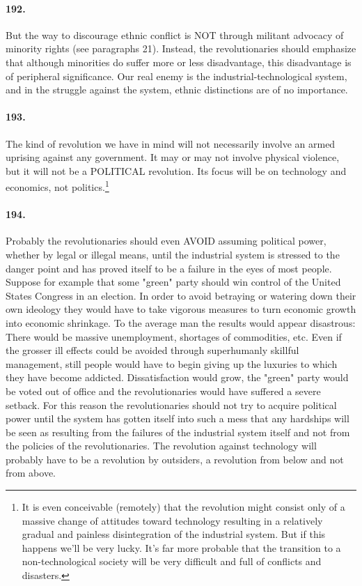 \documentclass[12pt]{book}
\begin{document}
\paragraph{192.}  But the way to discourage ethnic conflict is NOT through militant advocacy of minority rights (see paragraphs 21). Instead, the revolutionaries should emphasize that although minorities do suffer more or less disadvantage, this disadvantage is of peripheral significance. Our real enemy is the industrial-technological system, and in the struggle against the system, ethnic distinctions are of no importance.


\paragraph{193.} The kind of revolution we have in mind will not necessarily involve an armed uprising against any government. It may or may not involve physical violence, but it will not be a POLITICAL revolution. Its focus will be on technology and economics, not politics.\footnote{It is even conceivable (remotely) that the revolution might consist only of a massive change of attitudes toward technology resulting in a relatively gradual and painless disintegration of the industrial system. But if this happens we'll be very lucky. It's far more probable that the transition to a non-technological society will be very difficult and full of conflicts and disasters.}


\paragraph{194.}  Probably the revolutionaries should even AVOID assuming political power, whether by legal or illegal means, until the industrial system is stressed to the danger point and has proved itself to be a failure in the eyes of most people. Suppose for example that some "green" party should win control of the United States Congress in an election. In order to avoid betraying or watering down their own ideology they would have to take vigorous measures to turn economic growth into economic shrinkage. To the average man the results would appear disastrous: There would be massive unemployment, shortages of commodities, etc. Even if the grosser ill effects could be avoided through superhumanly skillful management, still people would have to begin giving up the luxuries to which they have become addicted. Dissatisfaction would grow, the "green" party would be voted out of office and the revolutionaries would have suffered a severe setback. For this reason the revolutionaries should not try to acquire political power until the system has gotten itself into such a mess that any hardships will be seen as resulting from the failures of the industrial system itself and not from the policies of the revolutionaries. The revolution against technology will probably have to be a revolution by outsiders, a revolution from below and not from above.
\end{document}
